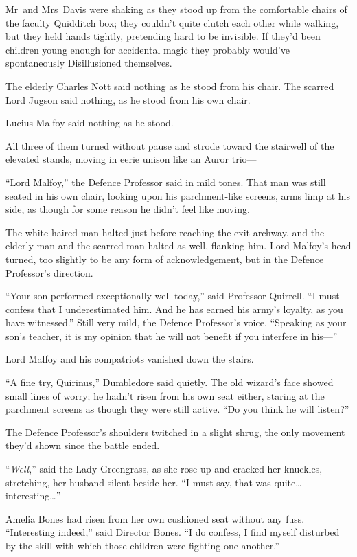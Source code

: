 \later

Mr~and Mrs~Davis were shaking as they stood up from the comfortable chairs of the faculty Quidditch box; they couldn’t quite clutch each other while walking, but they held hands tightly, pretending hard to be invisible. If they’d been children young enough for accidental magic they probably would’ve spontaneously Disillusioned themselves.

The elderly Charles Nott said nothing as he stood from his chair. The scarred Lord Jugson said nothing, as he stood from his own chair.

Lucius Malfoy said nothing as he stood.

All three of them turned without pause and strode toward the stairwell of the elevated stands, moving in eerie unison like an Auror trio—

“Lord Malfoy,” the Defence Professor said in mild tones. That man was still seated in his own chair, looking upon his parchment-like screens, arms limp at his side, as though for some reason he didn’t feel like moving.

The white-haired man halted just before reaching the exit archway, and the elderly man and the scarred man halted as well, flanking him. Lord Malfoy’s head turned, too slightly to be any form of acknowledgement, but in the Defence Professor’s direction.

“Your son performed exceptionally well today,” said Professor Quirrell. “I must confess that I underestimated him. And he has earned his army’s loyalty, as you have witnessed.” Still very mild, the Defence Professor’s voice. “Speaking as your son’s teacher, it is my opinion that he will not benefit if you interfere in his—”

Lord Malfoy and his compatriots vanished down the stairs.

“A fine try, Quirinus,” Dumbledore said quietly. The old wizard’s face showed small lines of worry; he hadn’t risen from his own seat either, staring at the parchment screens as though they were still active. “Do you think he will listen?”

The Defence Professor’s shoulders twitched in a slight shrug, the only movement they’d shown since the battle ended.

“\emph{Well},” said the Lady Greengrass, as she rose up and cracked her knuckles, stretching, her husband silent beside her. “I must say, that was quite…interesting…”

Amelia Bones had risen from her own cushioned seat without any fuss. “Interesting indeed,” said Director Bones. “I do confess, I find myself disturbed by the skill with which those children were fighting one another.”

